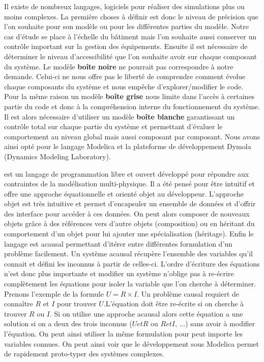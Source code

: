 Il existe de nombreux langages, logiciels pour réaliser des simulations plus ou moins complexes.
La première choses à définir est donc le niveau de précision que l’on souhaite pour son modèle ou
pour les différentes parties du modèle. Notre cas d’étude se place à l’échelle du bâtiment mais
l’on souhaite aussi conserver un contrôle important sur la gestion des équipements.
Ensuite il est nécessaire de déterminer le niveau d’accessibilité que l’on souhaite avoir
sur chaque composant du système. Le modèle \textbf{boîte noire} ne pourrait pas correspondre à notre
demande. Celui-ci ne nous offre pas le liberté de comprendre comment évolue chaque
composants du système et nous empêche d’explorer/modifier le code.
Pour la même raison un modèle \textbf{boîte grise} nous limite dans l’accès à certaines
partie du code et donc à la compréhension interne du fonctionnement du système.
Il est alors nécessaire d’utiliser un modèle \textbf{boîte blanche} garantissant
un contrôle total sur chaque partie du système et permettant d’évaluer le comportement
au niveau global mais aussi composant par composant.
Nous avons ainsi opté pour le langage Modelica et la plateforme de développement
Dymola (Dynamics Modeling Laboratory).


 est un langage de programmation libre et ouvert développé pour répondre aux
contraintes de la modélisation multi-physique. Il a été pensé pour être intuitif
et offre une approche équationnelle et orienté objet au développeur.
L’approche objet est très intuitive et permet d’encapsuler un ensemble de données
et d’offrir des interface pour accéder à ces données. On peut alors composer de nouveaux
objets grâce à des références vers d’autre objets (composition) ou en héritant
du comportement d’un objet pour lui ajouter une spécialisation (héritage).
Enfin le langage est acausal permettant d’itérer entre différentes formulation
d’un problème facilement. Un système acausal récupère l’ensemble des variables qu’il
connait et défini les inconnus à partir de celles-ci. L’ordre d’écriture des équations
n’est donc plus importante et modifier un système n’oblige pas à re-écrire complètement
les équations pour isoler la variable que l’on cherche à déterminer. Prenons l’exemple
de la formule $U = R \times I$. Un problème causal requiert de connaître $R$ et $I$
pour trouver $U$.L’équation doit être re-écrite si on cherche à trouver $R$ ou $I$.
Si on utilise une approche acausal alors cette équation a une solution si on a deux des
trois inconnus ($U et R$ ou $R et I$, ...) sans avoir à modifier l’équation. On peut ainsi utiliser
la même formulation pour peut importe les variables connues.
On peut ainsi voir que le développement sous Modelica permet de rapidement proto-typer
des systèmes complexes.


